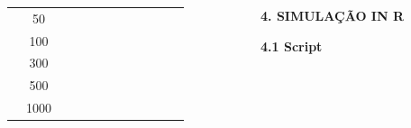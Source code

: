 \documentclass[final]{beamer}
\begin{document}
\begin{frame}[t]
\begin{columns}[t,totalwidth=0.6\paperwidth]
\begin{column}{0.45\paperwidth}
\begin{table}[H]
\begin{tabular}{c|c|c|c|c|c|c|c|c|c|c|c}
                         &  50      &       &       &       &      &       &             &       &         &         &        \\
                         & 100      &       &       &       &      &       &             &       &         &         &        \\
                         & 300      &       &       &       &      &       &             &       &         &         &        \\
                         & 500      &       &       &       &      &       &             &       &         &         &        \\
                         & 1000     &       &       &       &      &       &             &       &         &         &        \\
    \hline \hline
    \end{tabular}
    \label{tab:inverted2}
\end{table}


\vspace{1em}
 \justifying
 
  \end{column}
  \hspace{0.02\paperwidth} 

  \begin{column}{0.45\textwidth}
 
{\large\bfseries 4. SIMULAÇÃO IN R}\par
\justifying
\vspace{1.3cm}

{\large\bfseries 4.1 Script}\par
\vspace{1.3cm}


\end{column}
\end{columns}
\end{frame}
\end{document}
